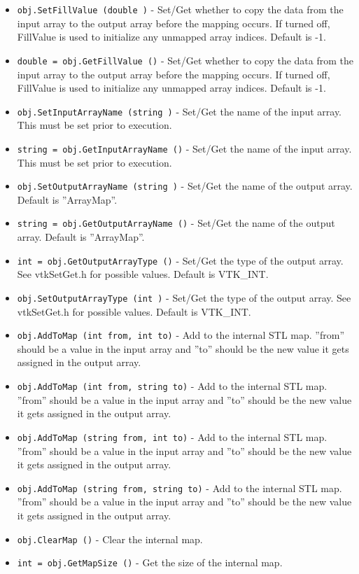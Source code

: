 \begin{itemize}
\item  \verb|obj.SetFillValue (double )| -  Set/Get whether to copy the data from the input array to the output array
 before the mapping occurs. If turned off, FillValue is used to initialize
 any unmapped array indices. Default is -1.

\item  \verb|double = obj.GetFillValue ()| -  Set/Get whether to copy the data from the input array to the output array
 before the mapping occurs. If turned off, FillValue is used to initialize
 any unmapped array indices. Default is -1.

\item  \verb|obj.SetInputArrayName (string )| -  Set/Get the name of the input array. This must be set prior to execution.

\item  \verb|string = obj.GetInputArrayName ()| -  Set/Get the name of the input array. This must be set prior to execution.

\item  \verb|obj.SetOutputArrayName (string )| -  Set/Get the name of the output array. Default is ''ArrayMap''.

\item  \verb|string = obj.GetOutputArrayName ()| -  Set/Get the name of the output array. Default is ''ArrayMap''.

\item  \verb|int = obj.GetOutputArrayType ()| -  Set/Get the type of the output array. See vtkSetGet.h for possible values. 
 Default is VTK\_INT.

\item  \verb|obj.SetOutputArrayType (int )| -  Set/Get the type of the output array. See vtkSetGet.h for possible values. 
 Default is VTK\_INT.

\item  \verb|obj.AddToMap (int from, int to)| -  Add to the internal STL map. ''from'' should be a value in the input array and
 ''to'' should be the new value it gets assigned in the output array. 

\item  \verb|obj.AddToMap (int from, string to)| -  Add to the internal STL map. ''from'' should be a value in the input array and
 ''to'' should be the new value it gets assigned in the output array. 

\item  \verb|obj.AddToMap (string from, int to)| -  Add to the internal STL map. ''from'' should be a value in the input array and
 ''to'' should be the new value it gets assigned in the output array. 

\item  \verb|obj.AddToMap (string from, string to)| -  Add to the internal STL map. ''from'' should be a value in the input array and
 ''to'' should be the new value it gets assigned in the output array. 

\item  \verb|obj.ClearMap ()| -  Clear the internal map.

\item  \verb|int = obj.GetMapSize ()| -  Get the size of the internal map.

\end{itemize}
